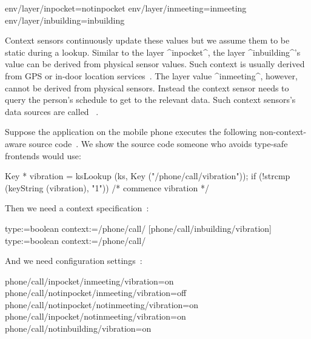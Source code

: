 \begin{code}[language=CfgElektra]
env/layer/inpocket=notinpocket
env/layer/inmeeting=inmeeting
env/layer/inbuilding=inbuilding
\end{code}

Context sensors continuously update these values but we assume them to be static during a lookup.
Similar to the layer ^inpocket^, the layer ^inbuilding^'s value can be derived from physical sensor values.
Such context is usually derived from GPS or in-door location services~\cite{niu2016wif4inl}.
The layer value ^inmeeting^, however, cannot be derived from physical sensors.
Instead the context sensor needs to query the person's schedule to get to the relevant data.
Such context sensors's data sources are called ~\cite{baldauf2007survey}.


Suppose the application on the mobile phone executes the following non-context-aware source code~\cite{raab2016unanticipated}.
We show the source code someone who avoids type-safe frontends would use:

\begin{code}[language=Cpp]
Key * vibration = ksLookup (ks, Key ("/phone/call/vibration"));
if (!strcmp (keyString (vibration), "1"))
{
	/* commence vibration */
}
\end{code}

Then we need a context specification~\cite{raab2016unanticipated}:

\begin{code}
  type:=boolean
  context:=/phone/call/%
[phone/call/inbuilding/vibration]
  type:=boolean
  context:=/phone/call/%
\end{code}



And we need configuration settings~\cite{raab2016unanticipated}:

\begin{code}[language=CfgElektra]
phone/call/inpocket/inmeeting/vibration=on
phone/call/notinpocket/inmeeting/vibration=off
phone/call/notinpocket/notinmeeting/vibration=on
phone/call/inpocket/notinmeeting/vibration=on
phone/call/notinbuilding/vibration=on
\end{code}


